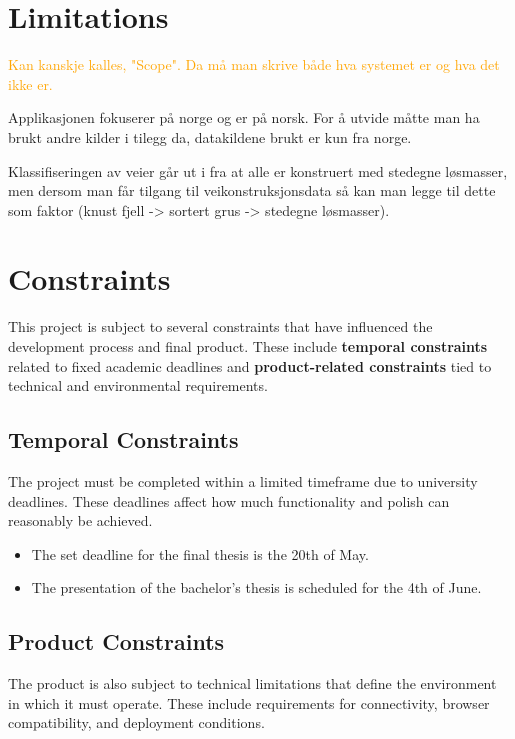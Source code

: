 \section{Limitations}

\textcolor{orange}{Kan kanskje kalles, "Scope". Da må man skrive både hva systemet er og hva det ikke er.}

Applikasjonen fokuserer på norge og er på norsk. For å utvide måtte man ha brukt andre kilder i tilegg da, datakildene brukt er kun fra norge.

Klassifiseringen av veier går ut i fra at alle er konstruert med stedegne løsmasser, men dersom man får tilgang til veikonstruksjonsdata så kan man legge til dette som faktor (knust fjell -> sortert grus -> stedegne løsmasser).


\section{Constraints}

This project is subject to several constraints that have influenced the development process and final product. These include \textbf{temporal constraints} related to fixed academic deadlines and \textbf{product-related constraints} tied to technical and environmental requirements.

\subsection{Temporal Constraints}

The project must be completed within a limited timeframe due to university deadlines. These deadlines affect how much functionality and polish can reasonably be achieved.

\begin{itemize}
    \item The set deadline for the final thesis is the 20th of May.
    \item The presentation of the bachelor's thesis is scheduled for the 4th of June.
\end{itemize}

\subsection{Product Constraints}

The product is also subject to technical limitations that define the environment in which it must operate. These include requirements for connectivity, browser compatibility, and deployment conditions.

